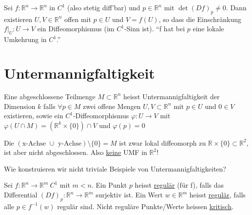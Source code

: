 \documentclass[../main.tex]{subfiles}
\begin{document}
\begin{recall}[Umkehrsatz]
Sei $f \colon \mathbb{R}^n \to \mathbb{R}^n$ in $C^1$ (also stetig diff'bar) und $p \in \mathbb{R}^n$ mit $\det(Df)_p \not = 0$. Dann existieren $U,V \in \mathbb{R}^n$ offen mit $p \in U$ und $V=f(U)$, so dass die Einschränkung $f\vert_U \colon U \to V$ ein Diffeomorphismus (im $C^1$-Sinn ist). ``f hat bei $p$ eine lokale Umkehrung in $C^1$.''
\end{recall}

\section{Untermannigfaltigkeit}

\begin{definition}
Eine abgeschlossene Teilmenge $M \subset \mathbb{R}^n$ heisst Untermannigfaltigkeit der Dimension $k$ falls
$\forall p \in M$ zwei offene Mengen $U,V \subset \mathbb{R}^n$ mit $p \in U$ und $0 \in V$ existieren, sowie ein $C^1$-Diffeomorphismus $\varphi \colon U \to V$ mit $\varphi \left(U \cap M\right) = \left(\mathbb{R}^k \times \{0\}\right) \cap V$ und $\varphi(p)=0$
\end{definition}


\begin{example}
\begin{minipage}[t]{30em}
Die $ \left( \text{x-Achse } \cup \text{ y-Achse}\right) \setminus \{0\} = M$ ist zwar lokal diffeomorph zu $\mathbb{R} \times \{0\} \subset \mathbb{R}^2$, ist aber nicht abgeschlossen. Also \underline{keine} UMF in $\mathbb{R}^2$! 
\end{minipage}
\begin{minipage}{1em}
\end{minipage}

\end{example}

\begin{question}
Wie konstruieren wir nicht triviale Beispiele von Untermannigfaltigkeiten?
\end{question}

\begin{definition}
Sei $f \colon \mathbb{R}^n \to \mathbb{R}^m \ C^1$ mit $m<n$.
Ein Punkt $p$ heisst \underline{regulär} (für f), falls das Differential $\left(Df\right)_p \colon \mathbb{R}^n
\to \mathbb{R}^m$ surjektiv ist. Ein Wert $w \in \mathbb{R}^m$ heisst \underline{regulär}, falls alle $p \in f^{-1}(w)$ regulär sind. Nicht reguläre Punkte/Werte heissen \underline{kritisch}.
\end{definition}
\end{document}
